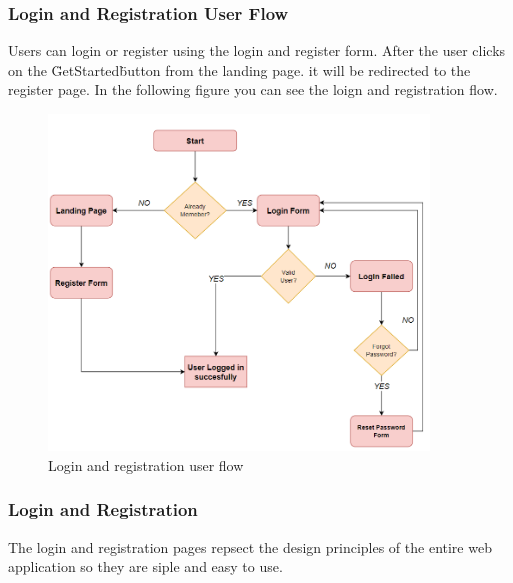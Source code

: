 \subsubsection{Login and Registration User Flow}
Users can login or register using the login and register form.
After the user clicks on the \"GetStarted\" button from the landing page. it will be redirected to the 
register page. 
In the following figure you can see the loign and registration flow.
\begin{figure}
    \centering
    \includegraphics[width=0.9\textwidth]{images/user_flow.png}
    \caption{Login and registration user flow}
    \label{fig:login-registration-flow}
\end{figure}



\subsubsection{Login and Registration}
The login and registration pages repsect the design principles of the entire web application so 
they are siple and easy to use. 



